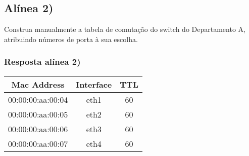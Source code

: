 \documentclass{article}
\begin{document}
\subsection{Alínea 2)}
Construa manualmente a tabela de comutação do switch do Departamento A, atribuindo números de porta à sua escolha.

\subsubsection{Resposta alínea 2)}

\begin{center}
\begin{tabular}{ |c |c| c| }
\hline
 Mac Address & Interface & TTL \\
\hline\hline
00:00:00:aa:00:04 & eth1 & 60 \\ [1ex] 
\hline
00:00:00:aa:00:05 & eth2 & 60 \\ [1ex]
\hline
00:00:00:aa:00:06 & eth3 & 60 \\ [1ex]
\hline
00:00:00:aa:00:07 & eth4 & 60  \\ [1ex]
\hline
\end{tabular}
\end{center}
\end{document}
